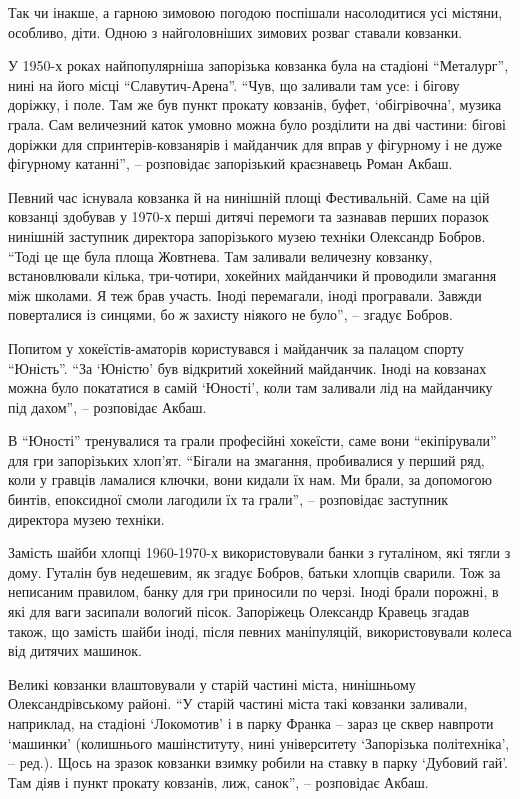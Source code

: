 Так чи інакше, а гарною зимовою погодою поспішали насолодитися усі містяни,
особливо, діти. Одною з найголовніших зимових розваг ставали ковзанки.

У 1950-х роках найпопулярніша запорізька ковзанка була на стадіоні \enquote{Металург},
нині на його місці \enquote{Славутич-Арена}. \enquote{Чув, що заливали там усе: і бігову
доріжку, і поле. Там же був пункт прокату ковзанів, буфет, \enquote{обігрівочна},
музика грала. Сам величезний каток умовно можна було розділити на дві частини:
бігові доріжки для спринтерів-ковзанярів і майданчик для вправ у фігурному і не
дуже фігурному катанні}, – розповідає запорізький краєзнавець Роман Акбаш.


Певний час існувала ковзанка й на нинішній площі Фестивальній. Саме на цій
ковзанці здобував у 1970-х перші дитячі перемоги та зазнавав перших поразок
нинішній заступник директора запорізького музею техніки Олександр Бобров. \enquote{Тоді
це ще була площа Жовтнева. Там заливали величезну ковзанку, встановлювали
кілька, три-чотири, хокейних майданчики й проводили змагання між школами. Я теж
брав участь. Іноді перемагали, іноді програвали. Завжди поверталися із синцями,
бо ж захисту ніякого не було}, – згадує Бобров.

Попитом у хокеїстів-аматорів користувався і майданчик за палацом спорту
\enquote{Юність}. \enquote{За \enquote{Юністю} був відкритий хокейний майданчик. Іноді на ковзанах
можна було покататися в самій \enquote{Юності}, коли там заливали лід на майданчику під
дахом}, – розповідає Акбаш.

В \enquote{Юності} тренувалися та грали професійні хокеїсти, саме вони \enquote{екіпірували}
для гри запорізьких хлоп’ят. \enquote{Бігали на змагання, пробивалися у перший ряд,
коли у гравців ламалися ключки, вони кидали їх нам. Ми брали, за допомогою
бинтів, епоксидної смоли лагодили їх та грали}, – розповідає заступник
директора музею техніки.

Замість шайби хлопці 1960-1970-х використовували банки з гуталіном, які тягли з
дому. Гуталін був недешевим, як згадує Бобров, батьки хлопців сварили. Тож за
неписаним правилом, банку для гри приносили по черзі. Іноді брали порожні, в
які для ваги засипали вологий пісок. Запоріжець Олександр Кравець згадав також,
що замість шайби іноді, після певних маніпуляцій, використовували колеса від
дитячих машинок.

Великі ковзанки влаштовували у старій частині міста, нинішньому
Олександрівському районі. \enquote{У старій частині міста такі ковзанки заливали,
наприклад, на стадіоні \enquote{Локомотив} і в парку Франка – зараз це сквер навпроти
\enquote{машинки} (колишнього машінституту, нині університету \enquote{Запорізька політехніка},
– ред.). Щось на зразок ковзанки взимку робили на ставку в парку \enquote{Дубовий гай}.
Там діяв і пункт прокату ковзанів, лиж, санок}, – розповідає Акбаш.


